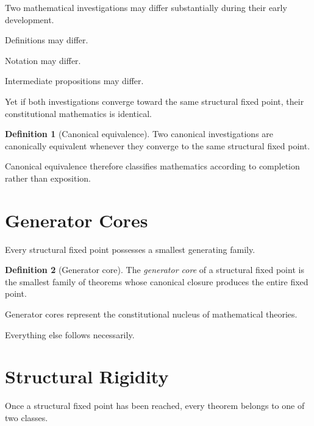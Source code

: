 \documentclass[13pt,openany]{book}
\theoremstyle{plain}
\theoremstyle{definition}
\newtheorem{definition}{Definition}[chapter]
\begin{document}
Two mathematical investigations may differ substantially during their early
development.

Definitions may differ.

Notation may differ.

Intermediate propositions may differ.

Yet if both investigations converge toward the same structural fixed point,
their constitutional mathematics is identical.

\begin{definition}[Canonical equivalence]

Two canonical investigations are canonically equivalent whenever they converge
to the same structural fixed point.

\end{definition}

Canonical equivalence therefore classifies mathematics according to completion
rather than exposition.

\section{Generator Cores}

Every structural fixed point possesses a smallest generating family.

\begin{definition}[Generator core]

The \emph{generator core} of a structural fixed point is the smallest family
of theorems whose canonical closure produces the entire fixed point.

\end{definition}

Generator cores represent the constitutional nucleus of mathematical theories.

Everything else follows necessarily.

\section{Structural Rigidity}

Once a structural fixed point has been reached, every theorem belongs to one of
two classes.
\end{document}
